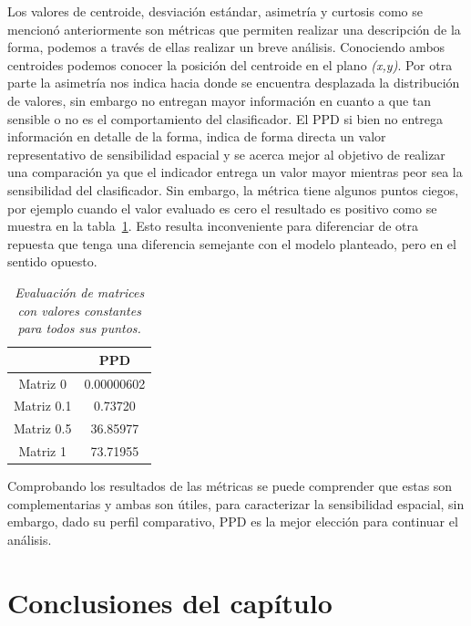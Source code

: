 Los valores de centroide, desviación estándar, asimetría y curtosis como se mencionó anteriormente son métricas que permiten realizar una descripción de la forma, podemos a través de ellas realizar un breve análisis. Conociendo ambos centroides podemos conocer la posición del centroide en el plano \textit{(x,y)}. Por otra parte la asimetría nos indica hacia donde se encuentra desplazada la distribución de valores, sin embargo no entregan mayor información en cuanto a que tan sensible o no es el comportamiento del clasificador. El PPD si bien no entrega información en detalle de la forma, indica de forma directa un valor representativo de sensibilidad espacial y se acerca mejor al objetivo de realizar una comparación ya que el indicador entrega un valor mayor mientras peor sea la sensibilidad del clasificador. Sin embargo, la métrica tiene algunos puntos ciegos, por ejemplo cuando el valor evaluado es cero el resultado es positivo  como se muestra en la tabla~\ref{tab:planas}. Esto resulta inconveniente para diferenciar de otra repuesta que tenga una diferencia semejante con el modelo planteado, pero en el sentido opuesto.

\begin{table}[htc]
\centering
  \caption{\em Evaluación de matrices con valores constantes para todos sus puntos. }   \label{tab:planas}
\begin{tabular}{c|c|}
\cline{2-2}
                                 & PPD    \\ \hline
\multicolumn{1}{|c|}{Matriz 0}   &  0.00000602 \\ \hline
\multicolumn{1}{|c|}{Matriz 0.1} &  0.73720 \\ \hline
\multicolumn{1}{|c|}{Matriz 0.5}  & 36.85977 \\ \hline
\multicolumn{1}{|c|}{Matriz 1}  &  73.71955 \\ \hline
\end{tabular}
\end{table}

Comprobando los resultados de las métricas se puede comprender que estas son complementarias y ambas son útiles, para caracterizar la sensibilidad espacial, sin embargo, dado su perfil comparativo, PPD es la mejor elección para continuar el análisis.

\section{Conclusiones del capítulo}
\label{metricas:conclusiones}

